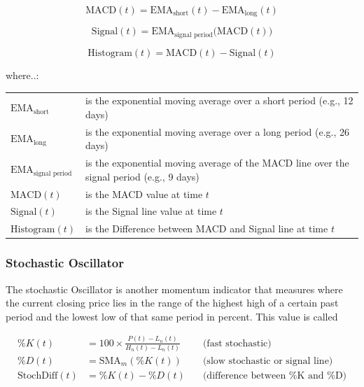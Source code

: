 \documentclass[a4paper,12pt]{report}
\begin{document}
\[
\text{MACD}(t) = \text{EMA}_{\text{short}}(t) - \text{EMA}_{\text{long}}(t)
\]

\[
\text{Signal}(t) = \text{EMA}_{\text{signal period}} \big(\text{MACD}(t)\big)
\]

\[
\text{Histogram}(t) = \text{MACD}(t) - \text{Signal}(t)
\]

where..:\\

\begin{tabularx}{\textwidth}{@{}l@{\hspace{2em}--\hspace{2em}}X@{}}
  $\text{EMA}_{\text{short}}$       & is the exponential moving average over a short period (e.g., 12 days) \\
  $\text{EMA}_{\text{long}}$        & is the exponential moving average over a long period (e.g., 26 days) \\
  $\text{EMA}_{\text{signal period}}$ & is the exponential moving average of the MACD line over the signal period (e.g., 9 days) \\
  $\text{MACD}(t)$                  & is the MACD value at time $t$ \\
  $\text{Signal}(t)$                & is the Signal line value at time $t$ \\
  $\text{Histogram}(t)$             & is the Difference between MACD and Signal line at time $t$ \\
\end{tabularx}

			\subsubsection{Stochastic Oscillator}
			
The stochastic Oscillator is another momentum indicator that measures where the current closing price lies in the range of the highest high of a certain past period and the lowest low of that same period in percent. This value is called %

\[
\begin{aligned}
  \%K(t) &= 100 \times \frac{P(t) - L_n(t)}{H_n(t) - L_n(t)} \quad & \text{(fast stochastic)} \\
  \%D(t) &= \text{SMA}_m(\%K(t)) \quad & \text{(slow stochastic or signal line)} \\
  \text{StochDiff}(t) &= \%K(t) - \%D(t) \quad & \text{(difference between \%K and \%D)} \\
\end{aligned}
\]
\end{document}
